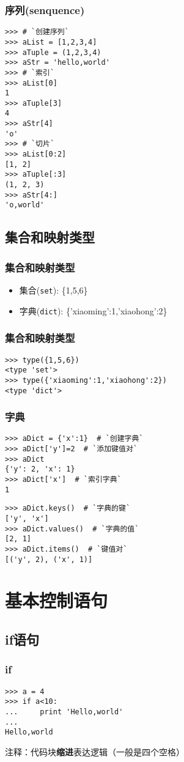 \documentclass[13pt]{beamer}
\begin{document}
\begin{frame}
\frametitle{序列(senquence)}
\begin{lstlisting}
>>> # `创建序列`
>>> aList = [1,2,3,4]
>>> aTuple = (1,2,3,4)
>>> aStr = 'hello,world'
>>> # `索引`
>>> aList[0]
1
>>> aTuple[3]
4
>>> aStr[4]
'o'
>>> # `切片`
>>> aList[0:2]
[1, 2]
>>> aTuple[:3]
(1, 2, 3)
>>> aStr[4:]
'o,world'
\end{lstlisting}
\end{frame}

\subsection{集合和映射类型}
\begin{frame}[containsverbatim]
\frametitle{集合和映射类型}
\begin{itemize}
\item 集合(\lstinline{set}): \{1,5,6\}
\item 字典(\lstinline{dict}): \{'xiaoming':1,'xiaohong':2\}
\end{itemize}
\end{frame}

\begin{frame}[containsverbatim]
\frametitle{集合和映射类型}
\begin{lstlisting}
>>> type({1,5,6})
<type 'set'>
>>> type({'xiaoming':1,'xiaohong':2})
<type 'dict'>
\end{lstlisting}
\end{frame}

\begin{frame}
\frametitle{字典}
\begin{lstlisting}
>>> aDict = {'x':1}  # `创建字典`
>>> aDict['y']=2  # `添加键值对`
>>> aDict
{'y': 2, 'x': 1}
>>> aDict['x']  # `索引字典`
1
\end{lstlisting}
\framebreak
\begin{lstlisting}
>>> aDict.keys()  # `字典的键`
['y', 'x']
>>> aDict.values()  # `字典的值`
[2, 1]
>>> aDict.items()  # `键值对`
[('y', 2), ('x', 1)]
\end{lstlisting}
\end{frame}

\section{基本控制语句}
\subsection{if语句}
\begin{frame}[containsverbatim]
\frametitle{if}
\begin{lstlisting}
>>> a = 4
>>> if a<10:
...     print 'Hello,world'
...
Hello,world
\end{lstlisting}
注释：代码块\textbf{缩进}表达逻辑（一般是四个空格）
\end{frame}
\end{document}
